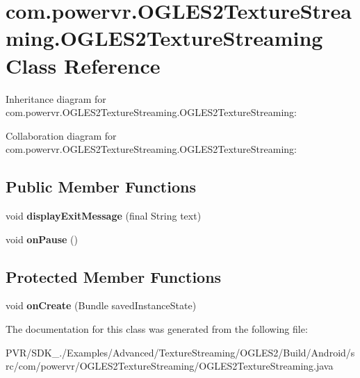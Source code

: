 \hypertarget{classcom_1_1powervr_1_1_o_g_l_e_s2_texture_streaming_1_1_o_g_l_e_s2_texture_streaming}{\section{com.\+powervr.\+O\+G\+L\+E\+S2\+Texture\+Streaming.\+O\+G\+L\+E\+S2\+Texture\+Streaming Class Reference}
\label{classcom_1_1powervr_1_1_o_g_l_e_s2_texture_streaming_1_1_o_g_l_e_s2_texture_streaming}
}


Inheritance diagram for com.\+powervr.\+O\+G\+L\+E\+S2\+Texture\+Streaming.\+O\+G\+L\+E\+S2\+Texture\+Streaming\+:


Collaboration diagram for com.\+powervr.\+O\+G\+L\+E\+S2\+Texture\+Streaming.\+O\+G\+L\+E\+S2\+Texture\+Streaming\+:
\subsection*{Public Member Functions}
\begin{DoxyCompactItemize}
\item 
\hypertarget{classcom_1_1powervr_1_1_o_g_l_e_s2_texture_streaming_1_1_o_g_l_e_s2_texture_streaming_a3d62d6232dadc5fa5e0c83573c02a4b6}{void {\bfseries display\+Exit\+Message} (final String text)}\label{classcom_1_1powervr_1_1_o_g_l_e_s2_texture_streaming_1_1_o_g_l_e_s2_texture_streaming_a3d62d6232dadc5fa5e0c83573c02a4b6}

\item 
\hypertarget{classcom_1_1powervr_1_1_o_g_l_e_s2_texture_streaming_1_1_o_g_l_e_s2_texture_streaming_af1ebba717af66f3554edf276efb53315}{void {\bfseries on\+Pause} ()}\label{classcom_1_1powervr_1_1_o_g_l_e_s2_texture_streaming_1_1_o_g_l_e_s2_texture_streaming_af1ebba717af66f3554edf276efb53315}

\end{DoxyCompactItemize}
\subsection*{Protected Member Functions}
\begin{DoxyCompactItemize}
\item 
\hypertarget{classcom_1_1powervr_1_1_o_g_l_e_s2_texture_streaming_1_1_o_g_l_e_s2_texture_streaming_a777e8e05aefaf93bf76685d53eb0ab20}{void {\bfseries on\+Create} (Bundle saved\+Instance\+State)}\label{classcom_1_1powervr_1_1_o_g_l_e_s2_texture_streaming_1_1_o_g_l_e_s2_texture_streaming_a777e8e05aefaf93bf76685d53eb0ab20}

\end{DoxyCompactItemize}


The documentation for this class was generated from the following file\+:\begin{DoxyCompactItemize}
\item 
P\+V\+R/\+S\+D\+K\+\_./\+Examples/\+Advanced/\+Texture\+Streaming/\+O\+G\+L\+E\+S2/\+Build/\+Android/src/com/powervr/\+O\+G\+L\+E\+S2\+Texture\+Streaming/O\+G\+L\+E\+S2\+Texture\+Streaming.\+java\end{DoxyCompactItemize}
